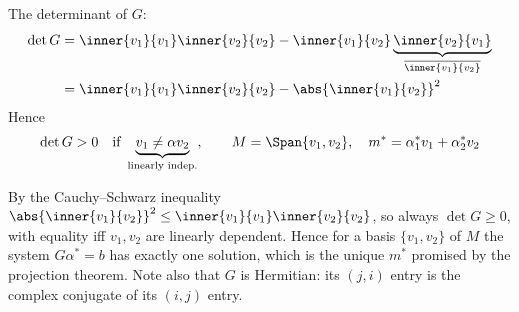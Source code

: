 \begin{example}
The determinant of $G$:
\begin{align*}
\det G &= \inner{v_1}{v_1}\inner{v_2}{v_2} - \inner{v_1}{v_2}\underbrace{\inner{v_2}{v_1}}_{\overline{\inner{v_1}{v_2}}}\\*
&= \inner{v_1}{v_1}\inner{v_2}{v_2} - \abs{\inner{v_1}{v_2}}^2
\end{align*}
Hence
\begin{gather*}
\det G > 0 \quad \text{if } \underbrace{v_1\neq \alpha v_2}_{\text{linearly indep.}}, \qquad
M = \Span\{v_1,v_2\}, \quad m^* = \alpha_1^* v_1 + \alpha_2^* v_2
\end{gather*}
\begin{insight}
By the Cauchy--Schwarz inequality $\abs{\inner{v_1}{v_2}}^2\le\inner{v_1}{v_1}\inner{v_2}{v_2}$, so always
$\det G\ge 0$, with equality iff $v_1,v_2$ are linearly dependent. Hence for a basis $\{v_1,v_2\}$ of $M$ the
system $G\alpha^*=b$ has exactly one solution, which is the unique $m^*$ promised by the projection theorem.
Note also that $G$ is Hermitian: its $(j,i)$ entry is the complex conjugate of its $(i,j)$ entry.
\end{insight}
\end{example}


